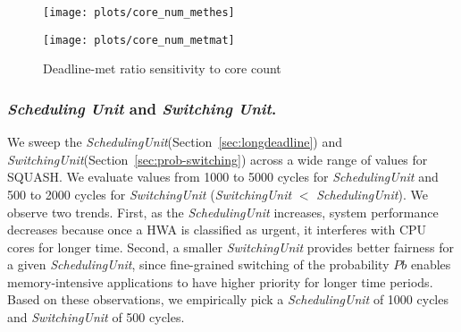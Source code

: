 \documentclass[10pt,letterpaper]{article}
\newif\ifSQUEEZE
\begin{document}
\begin{figure}[ht!]
  \centering
  \begin{minipage}{0.40\textwidth}
    \centering
    \texttt{[image: plots/core\_num\_methes]}
  \end{minipage}
  \begin{minipage}{0.40\textwidth}
    \centering
    \texttt{[image: plots/core\_num\_metmat]}
  \end{minipage}
\caption{Deadline-met ratio sensitivity to core count}
  \label{plot:core_num_ratio}
\end{figure}


\subsubsection{\emph{Scheduling Unit} and \emph{Switching Unit}.}
\ifSQUEEZE
We sweep the \textit{SchedulingUnit} (Section~\ref{sec:longdeadline}) from 1000 to 5000 cycles 
and \textit{SwitchingUnit} (Section~\ref{sec:prob-switching}) from 500 to 2000 cycles
(\textit{SwitchingUnit} $<$ \textit{SchedulingUnit}). 
We observe two trends.
First, as the \textit{SchedulingUnit} increases, system performance decreases
because once a HWA is classified as urgent, it interferes with CPU cores for
a longer time.
Second, a smaller \textit{SwitchingUnit} provides better fairness, since fine-grained 
switching of the probability $Pb$
enables memory-intensive applications to have higher priority for longer time
periods. Based on these observations, we empirically pick a \textit{SchedulingUnit} of 1000
cycles and \textit{SwitchingUnit} of 500 cycles.
\else
We sweep the \textit{SchedulingUnit}(Section~\ref{sec:longdeadline}) and
\textit{SwitchingUnit}(Section~\ref{sec:prob-switching}) across a wide range of
values for SQUASH. We evaluate values from 1000 to 5000 cycles for
\textit{SchedulingUnit} and 500 to 2000 cycles for \textit{SwitchingUnit}
(\textit{SwitchingUnit} $<$ \textit{SchedulingUnit}). 
We observe two trends.
First, as the \textit{SchedulingUnit} increases, system performance decreases
because once a HWA is classified as urgent, it interferes with CPU cores for
longer time.
Second, a smaller \textit{SwitchingUnit} provides better fairness for a given
\textit{SchedulingUnit}, since fine-grained switching of the probability $Pb$
enables memory-intensive applications to have higher priority for longer time
periods. Based on these observations, we empirically pick a \textit{SchedulingUnit} of 1000
cycles and \textit{SwitchingUnit} of 500 cycles.
\fi
\end{document}
